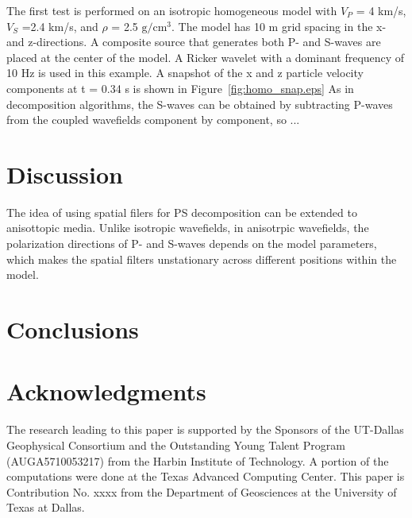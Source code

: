 \documentclass[manuscript,ulem,graphix,revised]{geophysics}
\begin{document}
The first test is performed on an isotropic homogeneous model with $V_P$ = 4 km/s, $V_S$ =2.4 km/s, and $\rho$ = 2.5 $\mathrm{g/cm^3}$. The model has 10 m grid spacing in the x- and z-directions. A composite source that generates both P- and S-waves are placed at the center of the model. A Ricker wavelet with a dominant frequency of 10 Hz is used in this example. A snapshot of the x and z particle velocity components at t = 0.34 s is shown in Figure~\ref{fig:homo_snap.eps}
As in decomposition algorithms, the S-waves can be obtained by subtracting P-waves from the coupled wavefields component by component, so ...


\section{Discussion}
\indent\indent
The idea of using spatial filers for PS decomposition can be extended to anisottopic media. Unlike isotropic wavefields, in anisotrpic wavefields, the polarization directions of P- and S-waves depends on the model parameters, which makes the spatial filters unstationary across different positions within the model. 



\section{Conclusions}



\section{Acknowledgments}

The research leading to this paper is supported by the Sponsors of the
UT-Dallas Geophysical Consortium and the Outstanding Young Talent Program (AUGA5710053217) from the Harbin Institute of Technology. A portion of the computations were done at the Texas Advanced Computing Center. This paper is Contribution No. xxxx
from the Department of Geosciences at the University of Texas at Dallas.



\newpage


\end{document}
